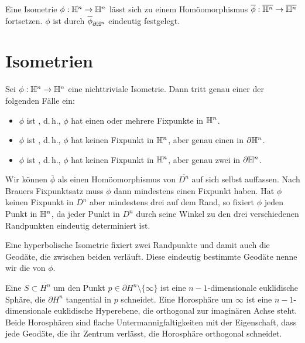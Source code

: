 \documentclass{book}
\begin{document}
\Lem{}
Eine Isometrie $\phi : \mathbb{H}^n \overset{}{\rightarrow} \mathbb{H}^n$ lässt sich zu einem Homöomorphismus $\overline{\phi} : \overline{\mathbb{H}^n} \overset{}{\rightarrow} \overline{\mathbb{H}^n} $ fortsetzen. $\phi$ ist durch $\overline{\phi}_{\partial \mathbb{H}^n}$ eindeutig festgelegt.

\section{Isometrien}
\Prop{}
Sei $\phi : \mathbb{H}^n \overset{}{\rightarrow} \mathbb{H}^n$ eine nichttriviale Isometrie. Dann tritt genau einer der folgenden Fälle ein:
\begin{itemize}
	\item $\phi$ ist , d.\,h., $\phi$ hat einen oder mehrere Fixpunkte in $\mathbb{H}^n$.
	\item $\phi$ ist , d.\,h., $\phi$ hat keinen Fixpunkt in $\mathbb{H}^n$, aber genau einen in $\partial \mathbb{H}^n$.
	\item $\phi$ ist , d.\,h., $\phi$ hat keinen Fixpunkt in $\mathbb{H}^n$, aber genau zwei in $\partial \mathbb{H}^n$.
\end{itemize}
\begin{Beweis}{}
Wir können $\overline{\phi}$ als einen Homöomorphismus von $\overline{D^n}$ auf sich selbst auffassen. Nach Brauers Fixpunktsatz muss $\phi$ dann mindestens einen Fixpunkt haben. Hat $\phi$ keinen Fixpunkt in $D^n$ aber mindestens drei auf dem Rand, so fixiert $\phi$ jeden Punkt in $\mathbb{H}^n$, da jeder Punkt in $D^n$ durch seine Winkel zu den drei verschiedenen Randpunkten eindeutig determiniert ist.
\end{Beweis}

\Def{}
Eine hyperbolische Isometrie fixiert zwei Randpunkte und damit auch die Geodäte, die zwischen beiden verläuft. Diese eindeutig bestimmte Geodäte nenne wir die  von $\phi$.

\Def{}
Eine  $S \subset \overline{H^n}$ um den Punkt $p \in \partial H^n\setminus\{\infty\}$ ist eine $n-1$-dimensionale euklidische Sphäre, die $\partial H^n$ tangential in $p$ schneidet. Eine Horosphäre um $\infty$ ist eine $n-1$-dimensionale euklidische Hyperebene, die orthogonal zur imaginären Achse steht.\\
Beide Horosphären sind flache Untermannigfaltigkeiten mit der Eigenschaft, dass jede Geodäte, die ihr Zentrum verlässt, die Horosphäre orthogonal schneidet.
\end{document}
